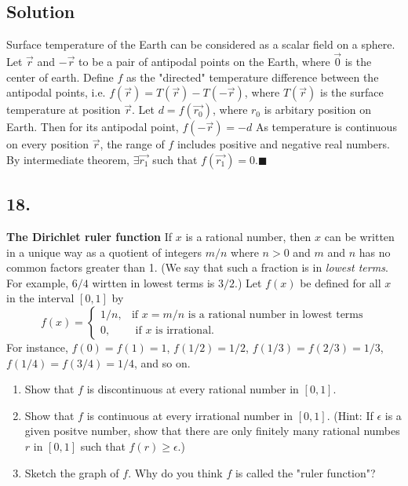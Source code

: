 \documentclass{article}
\begin{document}
\subsection*{Solution}
Surface temperature of the Earth can be considered as a scalar field on a sphere. \newline 
Let $\Vec{r}$ and $-\Vec{r}$ to be a pair of antipodal points on the Earth, where $\Vec{0}$ is the center of earth. \newline
Define $f$ as the "directed" temperature difference between the antipodal points, i.e. $f(\Vec{r})=T(\Vec{r})-T(-\Vec{r})$, where $T(\Vec{r})$ is the surface temperature at position $\Vec{r}$.\newline
Let $d=f(\Vec{r_0})$, where $r_0$ is arbitary position on Earth. Then for its antipodal point, $f(-\Vec{r})=-d$\newline
As temperature is continuous on every position $\Vec{r}$, the range of $f$ includes positive and negative real numbers. By intermediate theorem, $\exists \Vec{r_1}$ such that $f(\Vec{r_1})=0.\blacksquare$
\subsection*{18.}
\textbf{The Dirichlet ruler function} If $x$ is a rational number, then $x$ can be written in a unique way as a quotient of integers $m/n$ where $n>0$ and $m$ and $n$ has no common factors greater than 1. (We say that such a fraction is in \textit{lowest terms}. For example, $6/4$ wirtten in lowest terms is $3/2$.) Let $f(x)$ be defined for all $x$ in the interval $[0,1]$ by
\[f(x)=\left\{\begin{array}{ll}
1/n, & \text{if }x=m/n \text{ is a rational number in lowest terms} \\
0, & \text{ if } x \text{ is irrational.}
\end{array}\right.\]
For instance, $f(0)=f(1)=1$, $f(1/2)=1/2$, $f(1/3)=f(2/3)=1/3$, $f(1/4)=f(3/4)=1/4$, and so on.
\begin{enumerate} [label=\textbf{\alph*.}]
    \item Show that $f$ is discontinuous at every rational number in $[0,1]$.
    \item Show that $f$ is continuous at every irrational number in $[0,1]$. (Hint: If $\epsilon$ is a given positve number, show that there are only finitely many rational numbes $r$ in $[0,1]$ such that $f(r)\geq \epsilon$.)
    \item Sketch the graph of $f$. Why do you think $f$ is called the "ruler function"?
\end{enumerate}
\end{document}
